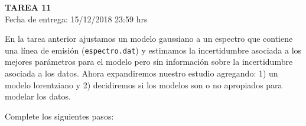 \documentclass[letter, 11pt]{article}
\newcommand{\tareanro}{11}
\newcommand{\fechaentrega}{15/12/2018 23:59 hrs}
\begin{document}
\thispagestyle{firstpage}

\begin{center}
  {\uppercase{\LARGE \bf Tarea \tareanro}}\\
  Fecha de entrega: \fechaentrega
\end{center}



En la tarea anterior ajustamos un modelo gaussiano a un espectro que contiene
una línea de emisión (\texttt{espectro.dat}) y estimamos la incertidumbre
asociada a los mejores parámetros para el modelo pero sin información sobre la
incertidumbre asociada a los datos. Ahora expandiremos nuestro estudio
agregando: 1) un modelo lorentziano y 2) decidiremos si los modelos son o no
apropiados para modelar los datos.

Complete los siguientes pasos:
\end{document}
